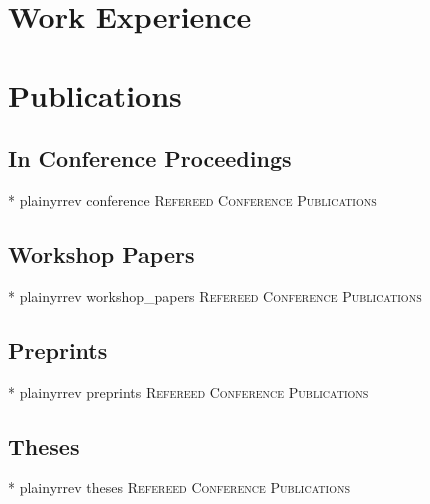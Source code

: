 \documentclass[10pt,a4paper,sans]{moderncv} %
\begin{document}
\section{Work Experience}


\section{Publications}

\subsection{In Conference Proceedings}
\nocite{conference}{*}
{plainyrrev}
{conference}
{\large \textsc{Refereed Conference Publications}}

\subsection{Workshop Papers}
\nocite{workshop_papers}{*}
{plainyrrev}
{workshop_papers}
{\large \textsc{Refereed Conference Publications}}

\subsection{Preprints}
\nocite{preprints}{*}
{plainyrrev}
{preprints}
{\large \textsc{Refereed Conference Publications}}

\subsection{Theses}
\nocite{theses}{*}
{plainyrrev}
{theses}
{\large \textsc{Refereed Conference Publications}}
\end{document}
